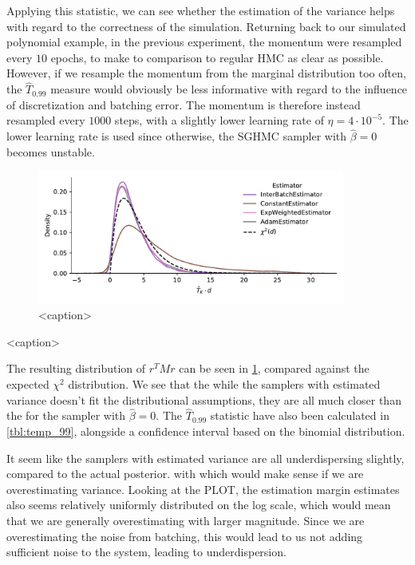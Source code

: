 Applying this statistic, we can see whether the estimation of the variance helps with regard to the correctness of the simulation. 
Returning back to our simulated polynomial example, in the previous experiment, the momentum were resampled every $10$ epochs, to make to comparison to regular HMC as clear as possible. 
However, if we resample the momentum from the marginal distribution too often, the $\hat{T}_{0.99}$ measure would obviously be less informative with regard to the influence of discretization and batching error. 
The momentum is therefore instead resampled every $1000$ steps, with a slightly lower learning rate of $\eta=4 \cdot 10^{-5}$.
The lower learning rate is used since otherwise, the SGHMC sampler with $\hat{\beta}=0$ becomes unstable. 
\begin{figure}[htb]
    \centering
    \includegraphics[width=0.9\textwidth]{Figures/temperature_sum_chi2_comp.pdf}
    \caption{<caption>}
    \label{fig:temperature_sum_chi2_comp}
\end{figure}
\begin{table}[htb]
    \centering
    
    \caption{<caption>}
    \label{tbl:temp_99}
\end{table}
The resulting distribution of $r^T M r$ can be seen in \cref{fig:temperature_sum_chi2_comp}, compared against the expected $\chi^2$ distribution. 
We see that the while the samplers with estimated variance doesn't fit the distributional assumptions, they are all much closer than the for the sampler with $\hat \beta = 0$.
The $\hat T_{0.99}$ statistic have also been calculated in \cref{tbl:temp_99}, alongside a confidence interval based on the binomial distribution.


It seem like the samplers with estimated variance are all underdispersing slightly, compared to the actual posterior. with  which would make sense if we are overestimating variance.
Looking at the PLOT, the estimation margin estimates also seems relatively uniformly distributed on the log scale, which would mean that we are generally overestimating with larger magnitude. 
Since we are overestimating the noise from batching, this would lead to us not adding sufficient noise to the system, leading to underdispersion.

